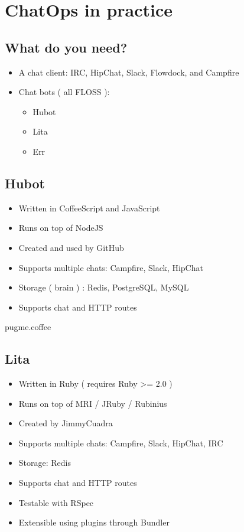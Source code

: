 \documentclass[
paper=128mm:96mm, %
fontsize=11pt, %
pagesize, %
parskip=half-, %
]{scrartcl} %
\theoremstyle{mythmstyle} %
\begin{document}
\clearpage


\section{ChatOps in practice}
\subsection{What do you need?}

\begin{itemize}
  \item A chat client: IRC, HipChat, Slack, Flowdock, and Campfire
  \item Chat bots ( all FLOSS ):
  \begin{itemize}
    \item Hubot
    \item Lita
    \item Err
  \end{itemize}
\end{itemize}
\clearpage


\subsection{Hubot}
\begin{itemize}
\item Written in CoffeeScript and JavaScript
\item Runs on top of NodeJS
\item Created and used by GitHub
\item Supports multiple chats: Campfire, Slack, HipChat
\item Storage ( brain ) : Redis, PostgreSQL, MySQL
\item Supports chat and HTTP routes
\end{itemize}
\clearpage


pugme.coffee
\clearpage


\subsection{Lita}
\begin{itemize}
\item Written in Ruby ( requires Ruby >= 2.0 )
\item Runs on top of MRI / JRuby / Rubinius
\item Created by JimmyCuadra
\item Supports multiple chats: Campfire, Slack, HipChat, IRC
\item Storage: Redis
\item Supports chat and HTTP routes
\item Testable with RSpec
\item Extensible using plugins through Bundler
\end{itemize}
\clearpage
\end{document}

